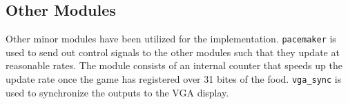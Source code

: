 \documentclass[paper=usletter, fontsize=12pt]{article}
\begin{document}
        \subsection{Other Modules} Other minor modules have been utilized for
        the implementation. \texttt{pacemaker} is used to send out control
        signals to the other modules such that they update at reasonable rates.
        The module consists of an internal counter that speeds up the update
        rate once the game has registered over 31 bites of the food.
        \texttt{vga\_sync} is used to synchronize the outputs to the VGA
        display.
\end{document}
